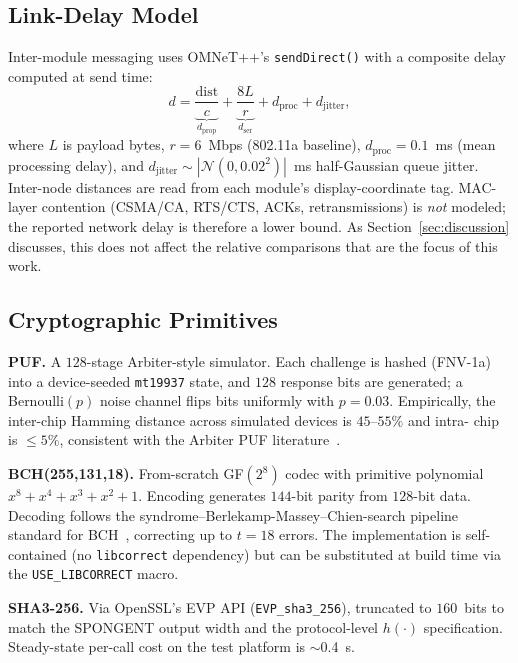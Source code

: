 \documentclass[journal,a4paper,10pt]{IEEEtran}
\begin{document}
\subsection{Link-Delay Model}
Inter-module messaging uses OMNeT++'s \texttt{sendDirect()} with a
composite delay computed at send time:
\begin{equation}
d = \underbrace{\frac{\mathrm{dist}}{c}}_{d_{\mathrm{prop}}}
  + \underbrace{\frac{8L}{r}}_{d_{\mathrm{ser}}}
  + d_{\mathrm{proc}}
  + d_{\mathrm{jitter}},
\label{eq:delay}
\end{equation}
where $L$ is payload bytes, $r=6$~Mbps (802.11a baseline),
$d_{\mathrm{proc}}=0.1$~ms (mean processing delay), and
$d_{\mathrm{jitter}}{\sim}|\mathcal{N}(0, 0.02^2)|$~ms half-Gaussian
queue jitter. Inter-node distances are read from each module's
display-coordinate tag. MAC-layer contention (CSMA/CA, RTS/CTS, ACKs,
retransmissions) is \emph{not} modeled; the reported network delay is
therefore a lower bound. As Section~\ref{sec:discussion} discusses,
this does not affect the relative comparisons that are the focus of
this work.

\subsection{Cryptographic Primitives}

\textbf{PUF.} A $128$-stage Arbiter-style simulator. Each challenge
is hashed (FNV-1a) into a device-seeded \texttt{mt19937} state, and
$128$ response bits are generated; a Bernoulli$(p)$ noise channel
flips bits uniformly with $p=0.03$. Empirically, the inter-chip
Hamming distance across simulated devices is $45$--$55\%$ and intra-
chip is $\le 5\%$, consistent with the Arbiter PUF
literature~\cite{arbiter_puf_iot}.

\textbf{BCH(255,131,18).} From-scratch GF$(2^8)$ codec with primitive
polynomial $x^8{+}x^4{+}x^3{+}x^2{+}1$. Encoding generates
$144$-bit parity from $128$-bit data. Decoding follows the
syndrome--Berlekamp-Massey--Chien-search pipeline standard for
BCH~\cite{sram_puf_bch}, correcting up to $t{=}18$ errors. The
implementation is self-contained (no \texttt{libcorrect} dependency)
but can be substituted at build time via the
\texttt{USE\_LIBCORRECT} macro.

\textbf{SHA3-256.} Via OpenSSL's EVP API
(\texttt{EVP\_sha3\_256}), truncated to $160$~bits to match the
SPONGENT output width and the protocol-level $h(\cdot)$
specification. Steady-state per-call cost on the test platform is
$\sim$0.4~\textmu s.
\end{document}
